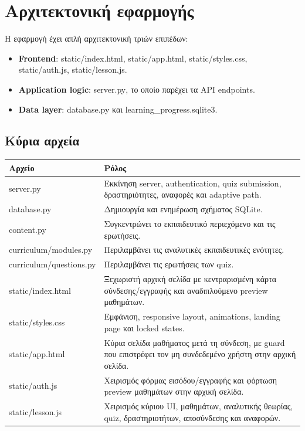 \documentclass[12pt,a4paper]{article}
\newcommand{\textlatin}[1]{\textenglish{#1}}
\begin{document}
\section{Αρχιτεκτονική εφαρμογής}

Η εφαρμογή έχει απλή αρχιτεκτονική τριών επιπέδων:

\begin{itemize}[leftmargin=1.2cm]
  \item \textbf{Frontend}: \textlatin{static/index.html}, \textlatin{static/app.html}, \textlatin{static/styles.css}, \textlatin{static/auth.js}, \textlatin{static/lesson.js}.
  \item \textbf{Application logic}: \textlatin{server.py}, το οποίο παρέχει τα \textlatin{API endpoints}.
  \item \textbf{Data layer}: \textlatin{database.py} και \textlatin{learning\_progress.sqlite3}.
\end{itemize}

\subsection{Κύρια αρχεία}

\begin{longtable}{|p{5cm}|p{9cm}|}
\hline
\textbf{Αρχείο} & \textbf{Ρόλος} \\
\hline
\textlatin{server.py} & Εκκίνηση server, authentication, quiz submission, δραστηριότητες, αναφορές και adaptive path. \\
\hline
\textlatin{database.py} & Δημιουργία και ενημέρωση σχήματος SQLite. \\
\hline
\textlatin{content.py} & Συγκεντρώνει το εκπαιδευτικό περιεχόμενο και τις ερωτήσεις. \\
\hline
\textlatin{curriculum/modules.py} & Περιλαμβάνει τις αναλυτικές εκπαιδευτικές ενότητες. \\
\hline
\textlatin{curriculum/questions.py} & Περιλαμβάνει τις ερωτήσεις των quiz. \\
\hline
\textlatin{static/index.html} & Ξεχωριστή αρχική σελίδα με κεντραρισμένη κάρτα σύνδεσης/εγγραφής και αναδιπλούμενο preview μαθημάτων. \\
\hline
\textlatin{static/styles.css} & Εμφάνιση, responsive layout, animations, landing page και locked states. \\
\hline
\textlatin{static/app.html} & Κύρια σελίδα μαθήματος μετά τη σύνδεση, με guard που επιστρέφει τον μη συνδεδεμένο χρήστη στην αρχική σελίδα. \\
\hline
\textlatin{static/auth.js} & Χειρισμός φόρμας εισόδου/εγγραφής και φόρτωση preview μαθημάτων στην αρχική σελίδα. \\
\hline
\textlatin{static/lesson.js} & Χειρισμός κύριου UI, μαθημάτων, αναλυτικής θεωρίας, quiz, δραστηριοτήτων, αποσύνδεσης και αναφορών. \\
\hline
\end{longtable}
\end{document}
